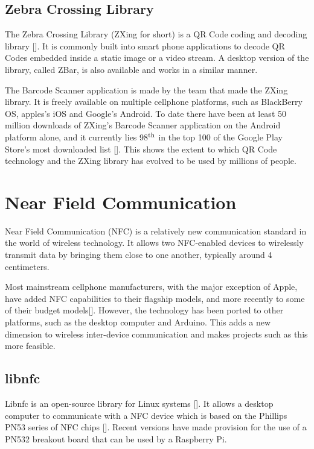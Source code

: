 \subsection{Zebra Crossing Library}
\label{sec:zbar}

The Zebra Crossing Library (ZXing for short) is a QR Code coding and decoding
library [\cite{website:zxing}]. It is commonly built into smart phone
applications to decode QR Codes embedded inside a static image or a video
stream. A desktop version of the library, called ZBar, is also available and
works in a similar manner.

The Barcode Scanner application is made by the team that made the ZXing library. It is freely
available on multiple cellphone platforms, such as BlackBerry OS, apples's iOS
and Google's Android. To date there have been at least 50 million downloads of ZXing's Barcode Scanner
application on the Android platform alone, and it currently lies 98$^{\rm th}$ in the
top 100 of the Google Play Store's most downloaded list
[\cite{website:barcodescanner}]. This shows the extent to which QR Code
technology and the ZXing library has evolved to be used by millions of people.

\section{Near Field Communication}

Near Field Communication (NFC) is a relatively new communication standard in the world of
wireless technology. It allows two NFC-enabled devices to wirelessly transmit data by bringing
them close to one another, typically around 4 centimeters.

Most mainstream cellphone manufacturers, with the major exception of Apple, have
added NFC capabilities to their flagship models, and more recently to some of
their budget models[\cite{website:nfc-models}]. However, the technology has been
ported to other platforms, such as the desktop computer and Arduino. This adds a
new dimension to wireless inter-device communication and makes projects such as
this more feasible.

\subsection{libnfc}

Libnfc is an open-source library for Linux systems [\cite{website:libnfc}]. It allows a
desktop computer to communicate with a NFC device which is based on the Phillips PN53
series of NFC chips [\cite{website:libnfc-hardware}]. Recent versions have made provision
for the use of a PN532 breakout board that can be used by a Raspberry Pi. 

